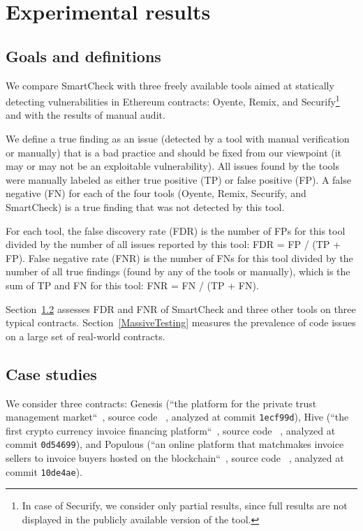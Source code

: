 \section{Experimental results} \label{SectionResults}

\subsection{Goals and definitions}

We compare SmartCheck with three freely available tools aimed at statically detecting vulnerabilities in Ethereum contracts: Oyente, Remix, and Securify\footnote{In case of Securify, we consider only partial results, since full results are not displayed in the publicly available version of the tool.} and with the results of manual audit.

We define a true finding as an issue (detected by a tool with manual verification or manually) that is a bad practice and should be fixed from our viewpoint (it may or may not be an exploitable vulnerability).
All issues found by the tools were manually labeled as either true positive (TP) or false positive (FP).
A false negative (FN) for each of the four tools (Oyente, Remix, Securify, and SmartCheck) is a true finding that was not detected by this tool.

For each tool, the false discovery rate (FDR) is the number of FPs for this tool divided by the number of all issues reported by this tool: FDR = FP / (TP + FP).
False negative rate (FNR) is the number of FNs for this tool divided by the number of all true findings (found by any of the tools or manually), which is the sum of TP and FN for this tool: FNR = FN / (TP + FN).

Section~\ref{ManualAudit} assesses FDR and FNR of SmartCheck and three other tools on three typical contracts.
Section~\ref{MassiveTesting} measures the prevalence of code issues on a large set of real-world contracts.


\subsection{Case studies} \label{ManualAudit}

We consider three contracts: Genesis (``the platform for the private trust management market``~\cite{Genesis}, source code ~\cite{GenesisGithub}, analyzed at commit \texttt{1ecf99d}), Hive (``the first crypto currency invoice financing platform``~\cite{Hive}, source code ~\cite{HiveGithub}, analyzed at commit \texttt{0d54699}), and Populous (``an online platform that matchmakes invoice sellers to invoice buyers hosted on the blockchain``~\cite{Populous}, source code ~\cite{PopulousGithub}, analyzed at commit \texttt{10de4ae}).

